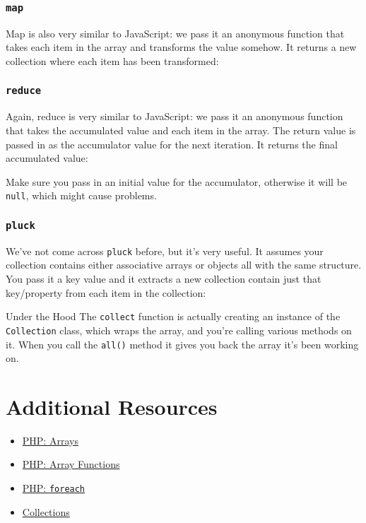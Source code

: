 
\subsubsection{\texttt{map}}

Map is also very similar to JavaScript: we pass it an anonymous function that takes each item in the array and transforms the value somehow. It returns a new collection where each item has been transformed:


\pagebreak

\subsubsection{\texttt{reduce}}

Again, reduce is very similar to JavaScript: we pass it an anonymous function that takes the accumulated value and each item in the array. The return value is passed in as the accumulator value for the next iteration. It returns the final accumulated value:


Make sure you pass in an initial value for the accumulator, otherwise it will be \texttt{null}, which might cause problems.

\subsubsection{\texttt{pluck}}

We've not come across \texttt{pluck} before, but it's very useful. It assumes your collection contains either associative arrays or objects all with the same structure. You pass it a key value and it extracts a new collection contain just that key/property from each item in the collection:



\begin{infobox}{Under the Hood}
    The \texttt{collect} function is actually creating an instance of the \texttt{Collection} class, which wraps the array, and you're calling various methods on it. When you call the \texttt{all()} method it gives you back the array it's been working on.
\end{infobox}


\section{Additional Resources}

\begin{itemize}[leftmargin=*]
    \item \href{http://www.php.net/manual/en/language.types.array.php}{PHP: Arrays}
    \item \href{https://www.php.net/manual/en/ref.array.php}{PHP: Array Functions}
    \item \href{http://www.php.net/manual/en/control-structures.foreach.php}{PHP: \texttt{foreach}}
    \item \href{http://laravel.com/docs/master/collections}{Collections}
\end{itemize}
